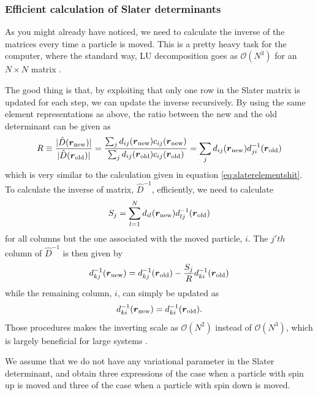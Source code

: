 \subsubsection{Efficient calculation of Slater determinants} \label{sec:efficientcalculationsofslaterdeterminant}
As you might already have noticed, we need to calculate the inverse of the matrices every time a particle is moved. This is a pretty heavy task for the computer, where the standard way, LU decomposition goes as $\mathcal{O}(N^3)$ for an $N\times N$ matrix \cite{trahan_computational_2006}. 

The good thing is that, by exploiting that only one row in the Slater matrix is updated for each step, we can update the inverse recursively. By using the same element representations as above, the ratio between the new and the old determinant can be given as
\begin{equation}
R\equiv \frac{|\hat{D}(\boldsymbol{{r}}_{\text{new}})|}{|\hat{D}(\boldsymbol{{r}}_{\text{old}})|}=\frac{\sum_{j}d_{ij}(\boldsymbol{{r}}_{\text{new}})c_{ij}(\boldsymbol{{r}}_{\text{new}})}{\sum_{j}d_{ij}(\boldsymbol{{r}}_{\text{old}})c_{ij}(\boldsymbol{{r}}_{\text{old}})}=\sum_{j}d_{ij}(\boldsymbol{{r}}_{\text{new}})d_{ji}^{-1}(\boldsymbol{{r}}_{\text{old}})
\end{equation}
which is very similar to the calculation given in equation \eqref{eq:slaterelementshit}. To calculate the inverse of matrix, $\hat{D}^{-1}$, efficiently, we need to calculate 
\begin{equation}
S_j=\sum_{l=1}^Nd_{il}(\boldsymbol{{r}}_{\text{new}})d_{lj}^{-1}(\boldsymbol{{r}}_{\text{old}})
\end{equation}
for all columns but the one associated with the moved particle, $i$. The $j'th$ column of $\hat{D}^{-1}$ is then given by 
\begin{equation}
d_{kj}^{-1}(\boldsymbol{{r}}_{\text{new}})=d_{kj}^{-1}(\boldsymbol{{r}}_{\text{old}})-\frac{S_j}{R}d_{ki}^{-1}(\boldsymbol{{r}}_{\text{old}})
\end{equation}
while the remaining column, $i$, can simply be updated as
\begin{equation}
d_{ki}^{-1}(\boldsymbol{{r}}_{\text{new}})=d_{ki}^{-1}(\boldsymbol{{r}}_{\text{old}}).
\end{equation}
Those procedures makes the inverting scale as $\mathcal{O}(N^2)$ instead of $\mathcal{O}(N^3)$, which is largely beneficial for large systems \cite{morten_hjorth-jensen_computational_2019}.

We assume that we do not have any variational parameter in the Slater determinant, and obtain three expressions of the case when a particle with spin up is moved and three of the case when a particle with spin down is moved. 

